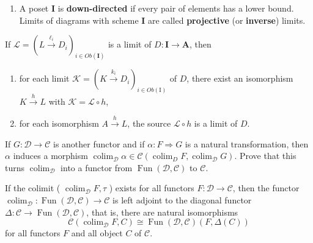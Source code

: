 \begin{example}
\begin{enumerate}
    \item A poset $\mathbf{I}$ is \textbf{down-directed} if every pair of elements has a lower bound. Limits of diagrams with scheme $\mathbf{I}$ are called \textbf{projective} (or \textbf{inverse}) limits. 
\end{enumerate}

\begin{prop}
If $\mathcal{L}=\left(L \xrightarrow{\ell_i} D_i\right)_{i \in O b(\mathbf{I})}$ is a limit of $D: \mathbf{I} \rightarrow \mathbf{A}$, then
    \begin{enumerate}
        \item for each limit $\mathcal{K}=\left(K \xrightarrow{k_i} D_i\right)_{i \in O b(\mathrm{I})}$ of $D$, there exist an isomorphism $K \xrightarrow{h} L$ with $\mathcal{K}=\mathcal{L} \circ h$,
        \item for each isomorphism $A \xrightarrow{h} L$, the source $\mathcal{L} \circ h$ is a limit of $D$.
    \end{enumerate}
\end{prop}


\begin{prop}
If $G: \mathcal{D} \rightarrow \mathcal{C}$ is another functor and if $\alpha: F \Rightarrow G$ is a natural transformation, then $\alpha$ induces a morphism $\operatorname{colim}_{\mathcal{D}} \alpha \in \mathcal{C}\left(\operatorname{colim}_D F, \operatorname{colim}_{\mathcal{D}} G\right)$. Prove that this turns $\operatorname{colim}_{\mathcal{D}}$ into a functor from $\operatorname{Fun}(\mathcal{D}, \mathcal{C})$ to $\mathcal{C}$.    
\end{prop}

\begin{prop}
If the colimit ( $\operatorname{colim}_{\mathcal{D}} F, \tau$ ) exists for all functors $F: \mathcal{D} \rightarrow \mathcal{C}$, then the functor $\operatorname{colim}_{\mathcal{D}}: \operatorname{Fun}(\mathcal{D}, \mathcal{C}) \rightarrow \mathcal{C}$ is left adjoint to the diagonal functor $\Delta: \mathcal{C} \rightarrow \operatorname{Fun}(\mathcal{D}, \mathcal{C})$, that is, there are natural isomorphisms
$$
\mathcal{C}\left(\operatorname{colim}_{\mathcal{D}} F, C\right) \cong \operatorname{Fun}(\mathcal{D}, \mathcal{C})(F, \Delta(C))
$$
for all functors $F$ and all object $C$ of $\mathcal{C}$.
\end{prop}


\end{example}
